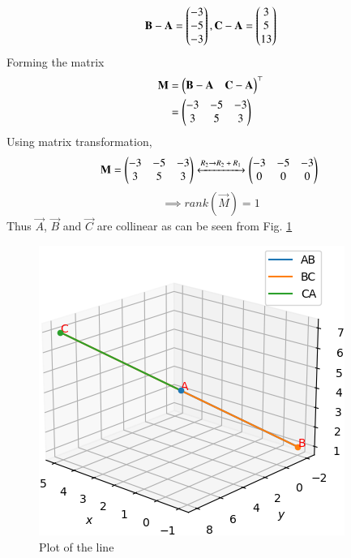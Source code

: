 
\begin{equation}
    \mathbf{B} - \mathbf{A} = \begin{pmatrix}-3\\-5\\-3\end{pmatrix}, \mathbf{C} - \mathbf{A} = \begin{pmatrix}3\\5\\13\end{pmatrix}
\end{equation}
Forming the matrix 
\begin{align}
    \mathbf{M} &= \begin{pmatrix}
    \mathbf{B} -  \mathbf{A} & \mathbf{C} - \mathbf{A}\\
    \end{pmatrix}^\top\\
    &= \begin{pmatrix}
    -3 & -5 & -3\\
    3 & 5 & 3\end{pmatrix}
\end{align}
Using matrix transformation,
\begin{align}
 \mathbf{M} = \begin{pmatrix}
    -3 & -5 & -3\\
    3 & 5 & 3\end{pmatrix}
    \xleftrightarrow{\text{$R_2$}\rightarrow{\text{$R_2 + R_1$ }}}
 \begin{pmatrix}
 -3 & -5 & -3\\
 0 & 0 & 0\end{pmatrix}\
\end{align}
\begin{equation}
   \implies rank(\vec{M}) = 1 
\end{equation}
Thus $\vec{A}$, $\vec{B}$ and $\vec{C}$ are collinear as can be seen from Fig. \ref{aug/2/14/plt}
\begin{figure}[!h]
    \centering
    \includegraphics[width=\columnwidth]{solutions/aug/2/14/Figures/plot.png}
    \caption{Plot of the line}
    \label{aug/2/14/plt}
    \end{figure}
